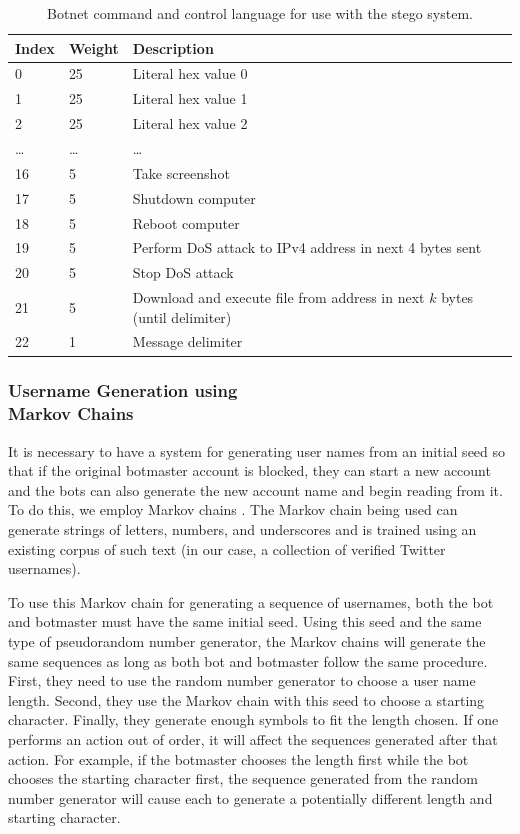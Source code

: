\begin{table}[h]
\centering
\begin{tabular}{|l|l|p{5cm}|}
\hline
Index & Weight & Description \\
\hline
0 & 25 & Literal hex value 0 \\
\hline
1 & 25 & Literal hex value 1 \\
\hline
2 & 25 & Literal hex value 2 \\
\hline
\ldots & \ldots &\ldots \\
\hline
16 & 5 & Take screenshot \\
\hline
17 & 5 & Shutdown computer \\
\hline
18 & 5 & Reboot computer \\
\hline
19 & 5 & Perform DoS attack to IPv4 address in next 4 bytes sent \\
\hline
20 & 5 & Stop DoS attack \\
\hline
21 & 5 & Download and execute file from address in next $k$ bytes (until delimiter) \\
\hline
22 & 1 & Message delimiter \\
\hline
\end{tabular}
\caption{Botnet command and control language for use with the stego system.}
\label{tab:botnet-cc-lang}
\end{table}

\subsubsection{Username Generation using \\Markov Chains}
\label{sec:methodology:usernames}

It is necessary to have a system for generating user names from an initial
seed so that if the original botmaster account is blocked, they can start
a new account and the bots can also generate the new account name and begin
reading from it.  To do this, we employ Markov chains \cite{Markov-chains}.
The Markov chain being used can generate strings of letters, numbers, and
underscores and is trained using an existing corpus of such text (in our case,
a collection of verified Twitter usernames). 

To use this Markov chain for generating a sequence of usernames, both the
bot and botmaster must have the same initial seed.  Using this seed and the
same type of pseudorandom number generator, the
Markov chains will generate the same sequences as long as both bot and
botmaster follow the same procedure.  First, they need to use the random
number generator to choose a user name length.  Second, they use the Markov
chain with this seed to choose
a starting character.  Finally, they generate enough symbols to fit the
length chosen.  If one performs an action out of order, it will affect
the sequences generated after that action.  For example, if the botmaster
chooses the length first while the bot chooses the starting character first,
the sequence generated from the random number generator will cause each to
generate a potentially different length and starting character.


